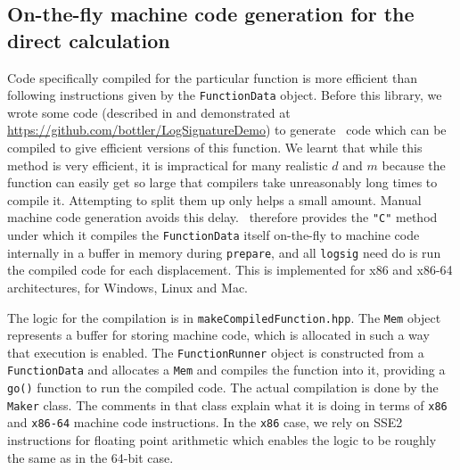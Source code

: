 

\subsection{On-the-fly machine code generation for the direct calculation}

Code specifically compiled for the particular function is more efficient than following instructions given by the \verb|FunctionData| object. Before this library, we wrote some code (described in \cite{LOGSIG} and demonstrated at \url{https://github.com/bottler/LogSignatureDemo}) to generate \CC\ code which can be compiled to give efficient versions of this function. We learnt that while this method is very efficient, it is impractical for many realistic $d$ and $m$ because the function can easily get so large that compilers take unreasonably long times to compile it. Attempting to split them up only helps a small amount. Manual machine code generation avoids this delay. \ii\ therefore provides the \verb|"C"| method under which it compiles the \verb|FunctionData| itself on-the-fly to machine code internally in a buffer in memory during \verb|prepare|, and all \verb|logsig| need do is run the compiled code for each displacement. This is implemented for x86 and x86-64 architectures, for Windows, Linux and Mac.

The logic for the compilation is in \verb|makeCompiledFunction.hpp|. 
The \verb|Mem| object represents a buffer for storing machine code, which is allocated in such a way that execution is enabled.
The \verb|FunctionRunner| object is constructed from a \verb|FunctionData| and allocates a \verb|Mem| and compiles the function into it, providing a \verb|go()| function to run the compiled code. The actual compilation is done by the \verb|Maker| class. The comments in that class explain what it is doing in terms of %
\verb|x86| and \verb|x86-64|
 machine code instructions. In the \verb|x86| case, we rely on SSE2 instructions for floating point arithmetic %
which enables the logic to be roughly the same as in the 64-bit case. 


